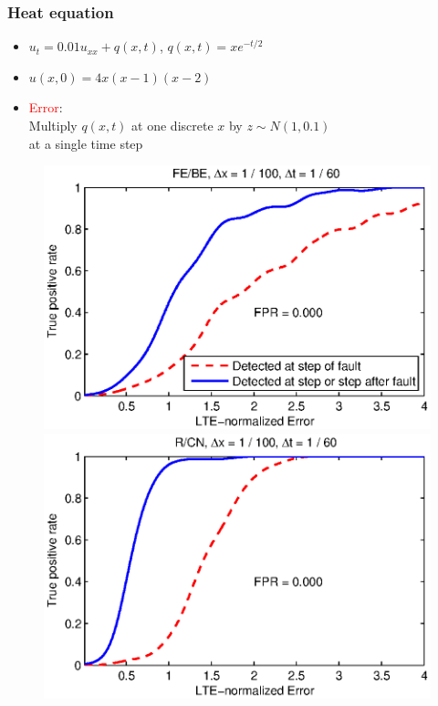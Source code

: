 \documentclass{beamer}
\begin{document}
\begin{frame}
\frametitle{Heat equation}

\begin{itemize}
\item  $u_t = 0.01u_{xx} + q(x, t)$, \quad $q(x, t) = xe^{-t/2}$
\item  $u(x, 0) = 4x(x-1)(x-2)$
\item \textcolor{red}{Error}: \\
Multiply $q(x, t)$ at one discrete $x$ by $z \sim N(1, 0.1)$ \\
at a single time step
\end{itemize}

\vspace{-0.5cm}
\begin{figure}
  \includegraphics[scale=0.5]{figs/heat_1a_BE.eps}
  \includegraphics[scale=0.5]{figs/heat_1a_CN.eps}
\end{figure}

\end{frame}
\end{document}
